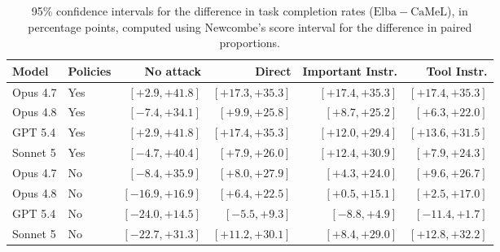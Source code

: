\begin{table}[htbp]
\centering
\small
\caption{95\% confidence intervals for the difference in task completion rates ($\mathrm{Elba} - \text{CaMeL}$), in percentage points, computed using Newcombe's score interval for the difference in paired proportions.}
\label{tab:agentdojo-cis}
\setlength{\tabcolsep}{3pt}
\begin{tabular}{llrrrr}
\toprule
Model & Policies & No attack & Direct & Important Instr. & Tool Instr. \\
\midrule
Opus 4.7 & Yes & $[+2.9, +41.8]$ & $[+17.3, +35.3]$ & $[+17.4, +35.3]$ & $[+17.4, +35.3]$ \\
Opus 4.8 & Yes & $[-7.4, +34.1]$ & $[+9.9, +25.8]$ & $[+8.7, +25.2]$ & $[+6.3, +22.0]$ \\
GPT 5.4 & Yes & $[+2.9, +41.8]$ & $[+17.4, +35.3]$ & $[+12.0, +29.4]$ & $[+13.6, +31.5]$ \\
Sonnet 5 & Yes & $[-4.7, +40.4]$ & $[+7.9, +26.0]$ & $[+12.4, +30.9]$ & $[+7.9, +24.3]$ \\
\midrule
Opus 4.7 & No & $[-8.4, +35.9]$ & $[+8.0, +27.9]$ & $[+4.3, +24.0]$ & $[+9.6, +26.7]$ \\
Opus 4.8 & No & $[-16.9, +16.9]$ & $[+6.4, +22.5]$ & $[+0.5, +15.1]$ & $[+2.5, +17.0]$ \\
GPT 5.4 & No & $[-24.0, +14.5]$ & $[-5.5, +9.3]$ & $[-8.8, +4.9]$ & $[-11.4, +1.7]$ \\
Sonnet 5 & No & $[-22.7, +31.3]$ & $[+11.2, +30.1]$ & $[+8.4, +29.0]$ & $[+12.8, +32.2]$ \\
\bottomrule
\end{tabular}
\end{table}
